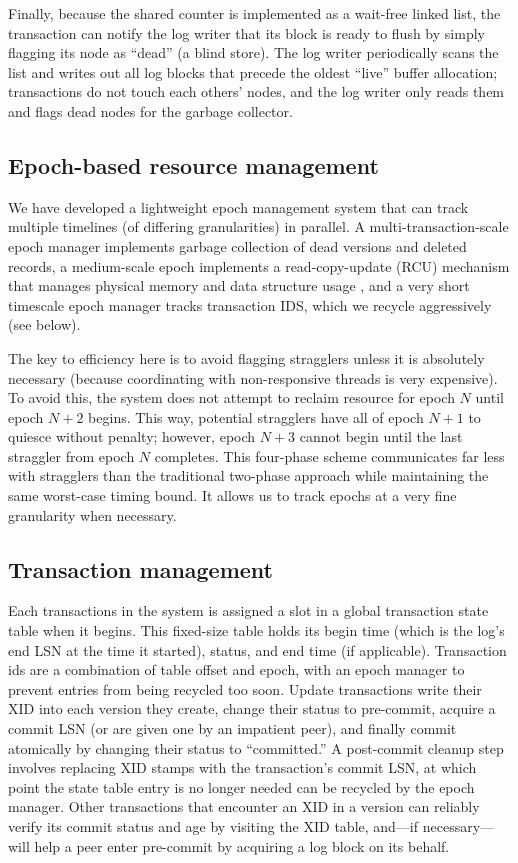 Finally, because the shared counter is implemented as a wait-free linked list, the transaction can notify the log writer that its block is ready to flush by simply flagging its node as ``dead'' (a blind store). The log writer periodically scans the list and writes out all log blocks that precede the oldest ``live'' buffer allocation; transactions do not touch each others' nodes, and the log writer only reads them and flags dead nodes for the garbage collector.

\subsection{Epoch-based resource management}
We have developed a lightweight epoch management system that can track multiple timelines (of differing granularities) in parallel. A multi-transaction-scale epoch manager implements garbage collection of dead versions and deleted records, a medium-scale epoch implements a read-copy-update (RCU) mechanism that manages physical memory and data structure usage \cite{RCU}, and a very short timescale epoch manager tracks transaction IDS, which we recycle aggressively (see below).

The key to efficiency here is to avoid flagging stragglers unless it is absolutely necessary (because coordinating with non-responsive threads is very expensive). To avoid this, the system does not attempt to reclaim resource for epoch $N$ until epoch $N+2$ begins. This way, potential stragglers have all of epoch $N+1$ to quiesce without penalty; however, epoch $N+3$ cannot begin until the last straggler from epoch $N$ completes. This four-phase scheme communicates far less with stragglers than the traditional two-phase approach while maintaining the same worst-case timing bound. It allows us to track epochs at a very fine granularity when necessary. 

\subsection{Transaction management}

Each transactions in the system is assigned a slot in a global transaction state table when it begins. This fixed-size table holds its begin time (which is the log's end LSN at the time it started), status, and end time (if applicable). Transaction ids are a combination of table offset and epoch, with an epoch manager to prevent entries from being recycled too soon. Update transactions write their XID into each version they create, change their status to pre-commit, acquire a commit LSN (or are given one by an impatient peer), and finally commit atomically by changing their status to ``committed.'' A post-commit cleanup step involves replacing XID stamps with the transaction's commit LSN, at which point the state table entry is no longer needed can be recycled by the epoch manager. Other transactions that encounter an XID in a version can reliably verify its commit status and age by visiting the XID table, and---if necessary---will help a peer enter pre-commit by acquiring a log block on its behalf. 


